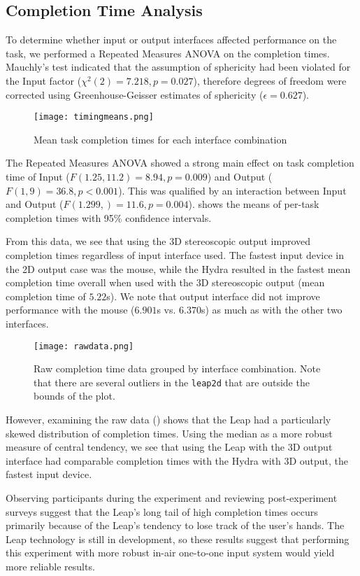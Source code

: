 \subsection{Completion Time Analysis}\label{sec:timing}
To determine whether input or output interfaces affected performance on the
task, we performed a Repeated Measures ANOVA on the completion times.
Mauchly's test indicated that the assumption of sphericity had been violated
for the Input factor ($\chi^2(2) = 7.218, p = 0.027$), therefore degrees of
freedom were corrected using Greenhouse-Geisser estimates of sphericity
($\epsilon = 0.627$).

\begin{figure}
    \centering
    \texttt{[image: timingmeans.png]}
    \caption{Mean task completion times for each interface combination}
    \label{fig:means}
\end{figure}

The Repeated Measures ANOVA showed a strong main effect on task
completion time of Input ($F(1.25,11.2) = 8.94, p = 0.009$) and Output ($F(1,9)
= 36.8, p < 0.001$). This was qualified by an interaction between Input and
Output ($F(1.299,) = 11.6, p = 0.004$).  shows the means
of per-task completion times with 95\% confidence intervals.

From this data, we see that using the 3D stereoscopic output improved
completion times regardless of input interface used. The fastest input device in
the 2D output case was the mouse, while the Hydra resulted in the fastest mean
completion time overall when used with the 3D stereoscopic output (mean
completion time of $5.22$s).
We note that output interface did not improve performance with the mouse
($6.901$s vs. $6.370$s) as much as with the other two interfaces.

\begin{figure*}
    \centering
    \texttt{[image: rawdata.png]}
    \caption{Raw completion time data grouped by interface combination.
             Note that there are several outliers in the {\tt leap2d} that
             are outside the bounds of the plot.}
    \label{fig:rawtimes}
\end{figure*}

However, examining the raw data () shows that
the Leap had a particularly skewed distribution of completion times.
Using the median as a more robust measure of central tendency, we see
that using the Leap with the 3D output interface had comparable completion
times with the Hydra with 3D output, the fastest input device.

Observing participants during the experiment and reviewing post-experiment
surveys suggest that the Leap's long tail of high completion times occurs
primarily because of the Leap's tendency to lose track of the user's hands.
The Leap technology is still in development, so these results suggest that
performing this experiment with more robust in-air one-to-one input
system would yield more reliable results.
